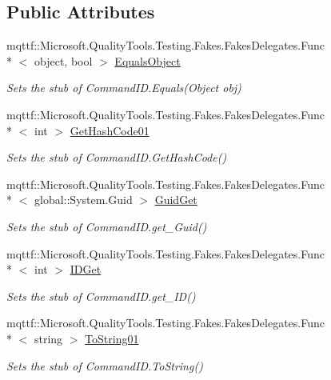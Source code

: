 \subsection*{Public Attributes}
\begin{DoxyCompactItemize}
\item 
mqttf\-::\-Microsoft.\-Quality\-Tools.\-Testing.\-Fakes.\-Fakes\-Delegates.\-Func\\*
$<$ object, bool $>$ \hyperlink{class_system_1_1_component_model_1_1_design_1_1_fakes_1_1_stub_command_i_d_adcb47b2e251a41699d8585f92735d821}{Equals\-Object}
\begin{DoxyCompactList}\small\item\em Sets the stub of Command\-I\-D.\-Equals(\-Object obj)\end{DoxyCompactList}\item 
mqttf\-::\-Microsoft.\-Quality\-Tools.\-Testing.\-Fakes.\-Fakes\-Delegates.\-Func\\*
$<$ int $>$ \hyperlink{class_system_1_1_component_model_1_1_design_1_1_fakes_1_1_stub_command_i_d_a522548449790c9fc499cefe64950fc7f}{Get\-Hash\-Code01}
\begin{DoxyCompactList}\small\item\em Sets the stub of Command\-I\-D.\-Get\-Hash\-Code()\end{DoxyCompactList}\item 
mqttf\-::\-Microsoft.\-Quality\-Tools.\-Testing.\-Fakes.\-Fakes\-Delegates.\-Func\\*
$<$ global\-::\-System.\-Guid $>$ \hyperlink{class_system_1_1_component_model_1_1_design_1_1_fakes_1_1_stub_command_i_d_a3aa44f64ef28d1267432bee824bcc1eb}{Guid\-Get}
\begin{DoxyCompactList}\small\item\em Sets the stub of Command\-I\-D.\-get\-\_\-\-Guid()\end{DoxyCompactList}\item 
mqttf\-::\-Microsoft.\-Quality\-Tools.\-Testing.\-Fakes.\-Fakes\-Delegates.\-Func\\*
$<$ int $>$ \hyperlink{class_system_1_1_component_model_1_1_design_1_1_fakes_1_1_stub_command_i_d_a50c0a766ddcade00f00ecfa3701c0d64}{I\-D\-Get}
\begin{DoxyCompactList}\small\item\em Sets the stub of Command\-I\-D.\-get\-\_\-\-I\-D()\end{DoxyCompactList}\item 
mqttf\-::\-Microsoft.\-Quality\-Tools.\-Testing.\-Fakes.\-Fakes\-Delegates.\-Func\\*
$<$ string $>$ \hyperlink{class_system_1_1_component_model_1_1_design_1_1_fakes_1_1_stub_command_i_d_a858c2cd6923dff4398dbf3fc0b329b52}{To\-String01}
\begin{DoxyCompactList}\small\item\em Sets the stub of Command\-I\-D.\-To\-String()\end{DoxyCompactList}\end{DoxyCompactItemize}
